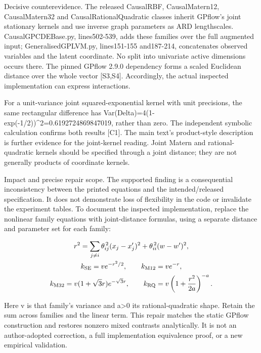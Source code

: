 \documentclass[10pt]{article}
\begin{document}
Decisive counterevidence. The released CausalRBF, CausalMatern12, CausalMatern32 and CausalRationalQuadratic classes inherit GPflow’s joint stationary kernels and use inverse graph parameters as ARD lengthscales. CausalGPCDEBase.py, lines502-539, adds these families over the full augmented input; GeneralisedGPLVM.py, lines151-155 and187-214, concatenates observed variables and the latent coordinate. No split into univariate active dimensions occurs there. The pinned GPflow 2.9.0 dependency forms a scaled Euclidean distance over the whole vector [S3,S4]. Accordingly, the actual inspected implementation can express interactions.\par
For a unit-variance joint squared-exponential kernel with unit precisions, the same rectangular difference has Var(Delta)=4(1-exp(-1/2))\textasciicircum{}2=0.6192724869847019, rather than zero. The independent symbolic calculation confirms both results [C1]. The main text’s product-style description is further evidence for the joint-kernel reading. Joint Matern and rational-quadratic kernels should be specified through a joint distance; they are not generally products of coordinate kernels.\par
Impact and precise repair scope. The supported finding is a consequential inconsistency between the printed equations and the intended/released specification. It does not demonstrate loss of flexibility in the code or invalidate the experiment tables. To document the inspected implementation, replace the nonlinear family equations with joint-distance formulas, using a separate distance and parameter set for each family:\par
\[\begin{gathered}r^2=\sum_{j\ne i}\theta_{ij}^{\,2}(x_j-x_j')^2+\theta_{ii}^{\,2}(w-w')^2,\\ k_{\rm SE}=v e^{-r^2/2},\qquad k_{\rm M12}=v e^{-r},\\ k_{\rm M32}=v(1+\sqrt{3}r)e^{-\sqrt{3}r},\qquad k_{\rm RQ}=v\left(1+\frac{r^2}{2a}\right)^{-a}.\end{gathered}\]\par
Here v is that family’s variance and a>0 its rational-quadratic shape. Retain the sum across families and the linear term. This repair matches the static GPflow construction and restores nonzero mixed contrasts analytically. It is not an author-adopted correction, a full implementation equivalence proof, or a new empirical validation.\par
\end{document}
